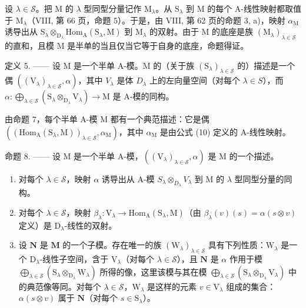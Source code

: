 设 \(\lambda \in \mathcal{S}\)。把 M 的 \(\lambda\) 型同型分量记作 \(\mathrm{M}_{\lambda}\)。从 \(\mathrm{S}_{\lambda}\) 到 M 的每个 A-线性映射都取值于 \(\mathrm{M}_{\lambda}\)（VIII, 第 66 页，命题 5）。于是，由 VIII, 第 62 页的命题 3, a)，映射 \(\alpha_{\mathrm{M}}\) 诱导出从 \(\mathrm{S}_{\lambda} \otimes_{\mathrm{D}_{\lambda}} \mathrm{Hom}_{\mathrm{A}}(\mathrm{S}_{\lambda}, \mathrm{M})\) 到 \(\mathrm{M}_{\lambda}\) 的双射。由于 M 的底座是族 \((\mathrm{M}_{\lambda})_{\lambda \in \mathcal{S}}\) 的直和，且模 M 是半单的当且仅当它等于自身的底座，命题得证。

定义 5. —— 设 M 是一个半单 A-模。M 的（关于族 \((\mathrm{S}_{\lambda})_{\lambda\in\mathcal{S}}\) 的）描述是一个偶 \(((\mathrm{V}_{\lambda})_{\lambda\in\mathcal{S}},\alpha)\)，其中 \(V_{\lambda}\) 是体 \(D_{\lambda}\) 上的左向量空间（对每个 \(\lambda\in S\)），而 \(\alpha:\bigoplus_{\lambda\in\mathcal{S}}(\mathrm{S}_{\lambda}\otimes_{\mathrm{D}_{\lambda}}\mathrm{V}_{\lambda})\to\mathrm{M}\) 是 A-模的同构。

由命题 7，每个半单 A-模 M 都有一个典范描述：它是偶 \(\left(\left(\mathrm{Hom}_{\mathrm{A}}\left(\mathrm{S}_{\lambda},\mathrm{M}\right)\right)_{\lambda \in \mathcal{S}},\alpha_{\mathrm{M}}\right)\)，其中 \(\alpha_{\mathrm{M}}\) 是由公式 (10) 定义的 A-线性映射。

命题 8. —— 设 M 是一个半单 A-模，\(((\mathrm{V}_{\lambda})_{\lambda \in \mathcal{S}}, \alpha)\) 是 M 的一个描述。

\begin{enumerate}
\def\labelenumi{\alph{enumi})}
\item
  对每个 \(\lambda \in \mathcal{S}\)，映射 \(\alpha\) 诱导出从 A-模 \(S_{\lambda} \otimes_{D_{\lambda}} V_{\lambda}\) 到 M 的 \(\lambda\) 型同型分量的同构。
\item
  对每个 \(\lambda \in \mathcal{S}\)，映射 \(\beta_{\lambda} : \mathrm{V}_{\lambda} \to \mathrm{Hom}_{\mathrm{A}}(\mathrm{S}_{\lambda}, \mathrm{M})\)（由 \(\beta_{\lambda}(v)(s) = \alpha(s \otimes v)\) 定义）是 \(\mathrm{D}_{\lambda}\)-线性的双射。
\item
  设 \(\mathbf{N}\) 是 \(\mathbf{M}\) 的一个子模。存在唯一的族 \((\mathrm{W}_{\lambda})_{\lambda \in \mathcal{S}}\) 具有下列性质：\(\mathrm{W}_{\lambda}\) 是一个 \(\mathrm{D}_{\lambda}\)-线性子空间，含于 \(\mathrm{V}_{\lambda}\)（对每个 \(\lambda \in \mathcal{S}\)），且 \(\mathbf{N}\) 是 \(\alpha\) 作用于模 \(\bigoplus_{\lambda \in \mathcal{S}} (\mathrm{S}_{\lambda} \otimes_{\mathrm{D}_{\lambda}} \mathrm{W}_{\lambda})\) 所得的像，这里该模与其在模 \(\bigoplus_{\lambda \in \mathcal{S}} (\mathrm{S}_{\lambda} \otimes_{\mathrm{D}_{\lambda}} \mathrm{V}_{\lambda})\) 中的典范像等同。对每个 \(\lambda \in \mathcal{S}\)，\(\mathrm{W}_{\lambda}\) 是这样的元素 \(v \in \mathrm{V}_{\lambda}\) 组成的集合：\(\alpha(s \otimes v)\) 属于 \(\mathbf{N}\)（对每个 \(s \in \mathrm{S}_{\lambda}\)）。
\end{enumerate}

